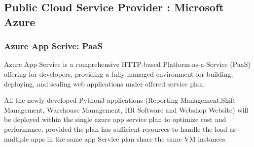 \documentclass{llncs}
\begin{document}
\subsection{Public Cloud Service Provider : Microsoft Azure}
\subsubsection{Azure App Serive: PaaS} \leavevmode\newline
Azure App Service is a comprehensive HTTP-based  Platform-as-a-Service (PaaS) offering for developers, providing a fully managed environment for building, deploying, and scaling web applications under offered service plan.

All the newly developed Python3 applications (Reporting Management,Shift Management, Warehouse Management, HR Software and Webshop Website) will be deployed within the single azure app service plan to optimize cost and performance, provided the plan has sufficient resources to handle the load as multiple apps in the same app Service plan share the same VM instances.
\end{document}
